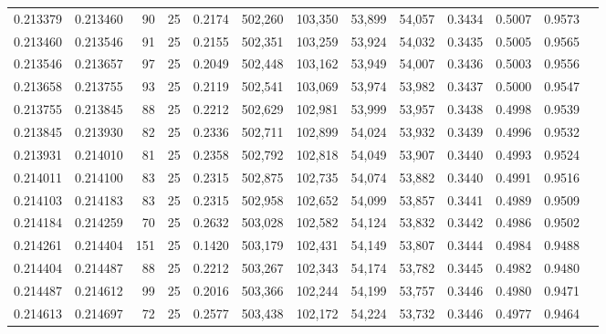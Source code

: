 \begin{tabular}{rrrrrrrrrrrrr}
0.213379 & 0.213460 &    90 &  25 &                                     0.2174 & 502,260 & 103,350 &  53,899 &  54,057 & 0.3434 & 0.5007 & 0.9573 \\
0.213460 & 0.213546 &    91 &  25 &                                     0.2155 & 502,351 & 103,259 &  53,924 &  54,032 & 0.3435 & 0.5005 & 0.9565 \\
0.213546 & 0.213657 &    97 &  25 &                                     0.2049 & 502,448 & 103,162 &  53,949 &  54,007 & 0.3436 & 0.5003 & 0.9556 \\
0.213658 & 0.213755 &    93 &  25 &                                     0.2119 & 502,541 & 103,069 &  53,974 &  53,982 & 0.3437 & 0.5000 & 0.9547 \\
0.213755 & 0.213845 &    88 &  25 &                                     0.2212 & 502,629 & 102,981 &  53,999 &  53,957 & 0.3438 & 0.4998 & 0.9539 \\
0.213845 & 0.213930 &    82 &  25 &                                     0.2336 & 502,711 & 102,899 &  54,024 &  53,932 & 0.3439 & 0.4996 & 0.9532 \\
0.213931 & 0.214010 &    81 &  25 &                                     0.2358 & 502,792 & 102,818 &  54,049 &  53,907 & 0.3440 & 0.4993 & 0.9524 \\
0.214011 & 0.214100 &    83 &  25 &                                     0.2315 & 502,875 & 102,735 &  54,074 &  53,882 & 0.3440 & 0.4991 & 0.9516 \\
0.214103 & 0.214183 &    83 &  25 &                                     0.2315 & 502,958 & 102,652 &  54,099 &  53,857 & 0.3441 & 0.4989 & 0.9509 \\
0.214184 & 0.214259 &    70 &  25 &                                     0.2632 & 503,028 & 102,582 &  54,124 &  53,832 & 0.3442 & 0.4986 & 0.9502 \\
0.214261 & 0.214404 &   151 &  25 &                                     0.1420 & 503,179 & 102,431 &  54,149 &  53,807 & 0.3444 & 0.4984 & 0.9488 \\
0.214404 & 0.214487 &    88 &  25 &                                     0.2212 & 503,267 & 102,343 &  54,174 &  53,782 & 0.3445 & 0.4982 & 0.9480 \\
0.214487 & 0.214612 &    99 &  25 &                                     0.2016 & 503,366 & 102,244 &  54,199 &  53,757 & 0.3446 & 0.4980 & 0.9471 \\
0.214613 & 0.214697 &    72 &  25 &                                     0.2577 & 503,438 & 102,172 &  54,224 &  53,732 & 0.3446 & 0.4977 & 0.9464 \\

\end{tabular}
